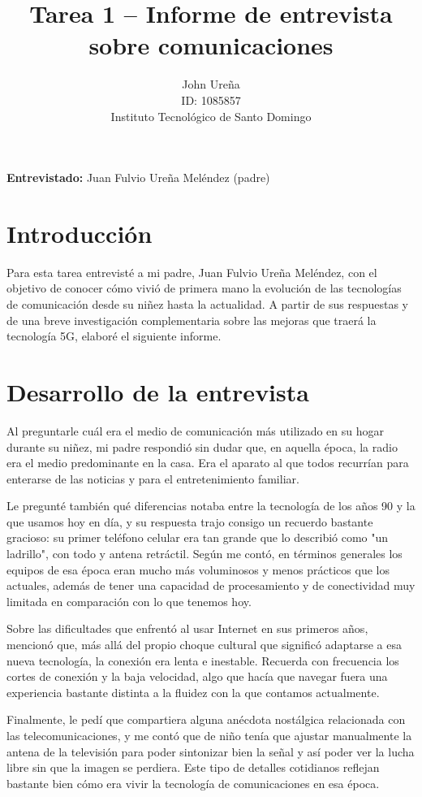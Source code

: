 \documentclass[12pt,a4paper]{article}
\title{Tarea 1 -- Informe de entrevista sobre comunicaciones}
\author{John Ureña \\
ID: 1085857 \\
Instituto Tecnológico de Santo Domingo}
\date{}
\begin{document}
\maketitle

\textbf{Entrevistado:} Juan Fulvio Ureña Meléndez (padre)

\section*{Introducción}
Para esta tarea entrevisté a mi padre, Juan Fulvio Ureña Meléndez, con el objetivo de conocer cómo vivió de primera mano la evolución de las tecnologías de comunicación desde su niñez hasta la actualidad. A partir de sus respuestas y de una breve investigación complementaria sobre las mejoras que traerá la tecnología 5G, elaboré el siguiente informe.

\section*{Desarrollo de la entrevista}
Al preguntarle cuál era el medio de comunicación más utilizado en su hogar durante su niñez, mi padre respondió sin dudar que, en aquella época, la radio era el medio predominante en la casa. Era el aparato al que todos recurrían para enterarse de las noticias y para el entretenimiento familiar.

Le pregunté también qué diferencias notaba entre la tecnología de los años 90 y la que usamos hoy en día, y su respuesta trajo consigo un recuerdo bastante gracioso: su primer teléfono celular era tan grande que lo describió como "un ladrillo", con todo y antena retráctil. Según me contó, en términos generales los equipos de esa época eran mucho más voluminosos y menos prácticos que los actuales, además de tener una capacidad de procesamiento y de conectividad muy limitada en comparación con lo que tenemos hoy.

Sobre las dificultades que enfrentó al usar Internet en sus primeros años, mencionó que, más allá del propio choque cultural que significó adaptarse a esa nueva tecnología, la conexión era lenta e inestable. Recuerda con frecuencia los cortes de conexión y la baja velocidad, algo que hacía que navegar fuera una experiencia bastante distinta a la fluidez con la que contamos actualmente.

Finalmente, le pedí que compartiera alguna anécdota nostálgica relacionada con las telecomunicaciones, y me contó que de niño tenía que ajustar manualmente la antena de la televisión para poder sintonizar bien la señal y así poder ver la lucha libre sin que la imagen se perdiera. Este tipo de detalles cotidianos reflejan bastante bien cómo era vivir la tecnología de comunicaciones en esa época.
\end{document}
